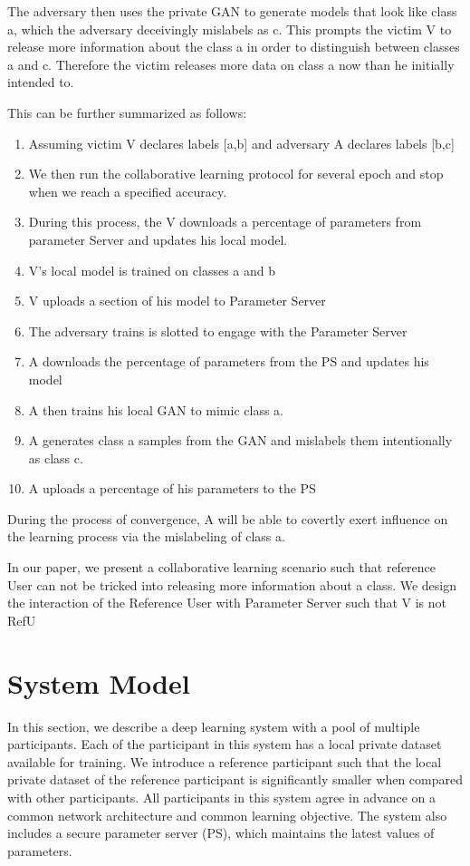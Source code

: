 \documentclass[conference]{IEEEtran}
\begin{document}
The adversary then uses the private GAN to generate models that look like class a, which the adversary deceivingly mislabels as c. This prompts the victim V to release more information about the class a in order to distinguish between classes a and c. Therefore the victim releases more data on class a now than he initially intended to.

This can be further summarized as follows:
\begin {enumerate}
\item Assuming victim V declares labels [a,b] and adversary A declares labels [b,c]
\item We then run the collaborative learning protocol for several epoch and stop when we reach a specified accuracy.
\item During this process, the V downloads a percentage of parameters from parameter Server and updates his local model.
\item V's local model is trained on classes a and b
\item V uploads a section of his model to Parameter Server
\item The adversary trains is slotted to engage with the Parameter Server
\item A downloads the percentage of parameters from the PS and updates his model
\item A then trains his local GAN to mimic class a.
\item A generates class a samples from the GAN and mislabels them intentionally as class c.
\item A uploads a percentage of his parameters to the PS

\end {enumerate}
During the process of convergence, A will be able to covertly exert influence on the learning process via the mislabeling of class a. 

In our paper, we present a collaborative learning scenario such that reference User can not be tricked into releasing more information about a class. We design the interaction of the Reference User with Parameter Server such that V is not RefU

\section{System Model}
In this section, we describe a deep learning system with a pool of multiple participants. Each of the participant in this system has a local private dataset available for training. We introduce a reference participant such that the local private dataset of the reference participant is significantly smaller when compared with other participants. All participants in this system agree in advance on a common network architecture and common learning objective. The system also includes a secure parameter server (PS), which maintains the latest values of parameters. 
\end{document}
